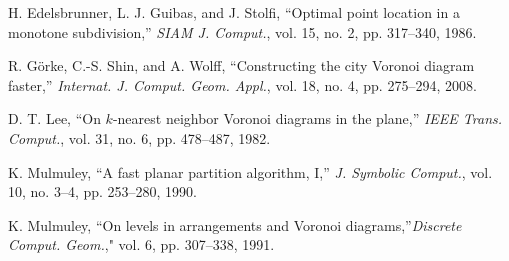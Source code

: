 \documentclass[11pt]{llncs}
\newcommand{\rephrase}[3]{\noindent\textbf{#1~#2.}~\emph{#3}}
\newcommand{\deleted}[1]{}
\begin{document}
\begin{thebibliography}{7}
H. Edelsbrunner, L. J. Guibas, and J. Stolfi,
``Optimal point location in a monotone subdivision,''
\emph{SIAM J. Comput.},
vol. 15, no. 2, pp. 317--340, 1986.

R. G\"{o}rke, C.-S. Shin, and A. Wolff,
``Constructing the city Voronoi diagram faster,''
\emph{Internat. J. Comput. Geom. Appl.},
vol. 18, no. 4, pp. 275--294, 2008.

 D. T. Lee, ``On $k$-nearest neighbor Voronoi diagrams in the plane,''
\emph{IEEE Trans. Comput.}, vol. 31, no. 6, pp. 478--487, 1982.

K. Mulmuley,
``A fast planar partition algorithm, I,''
\emph{J. Symbolic Comput.},
vol. 10, no. 3--4, pp. 253--280, 1990.

K. Mulmuley, ``On levels in arrangements and Voronoi diagrams,''\emph{Discrete Comput. Geom.}," vol. 6, pp. 307--338, 1991.




\end{thebibliography}

\deleted{
\newpage
\appendix
\section*{Appendix}




\rephrase{Lemma}{\ref{lem-mix-diagram}}{\lemmixdiagramtext}




\rephrase{Lemma}{\ref{lem-mix-vertices}}{\lemmixverticestext}



\rephrase{Theorem}{\ref{thm-lower-diagram}}{\thmlowerdiagramtext}




\rephrase{Lemma}{\ref{lem-compute-region}}{\lemcomputeregion}


\rephrase{Lemma}{\ref{lem-compute-diagram}}{\lemcomputediagramtext}


\rephrase{Theorem}{\ref{thm-kth-time}}{\thmkthtimetext}



\rephrase{Theorem}{\ref{thm-farthest-time}}{\thmfarthesttimetext}



}
\end{document}
